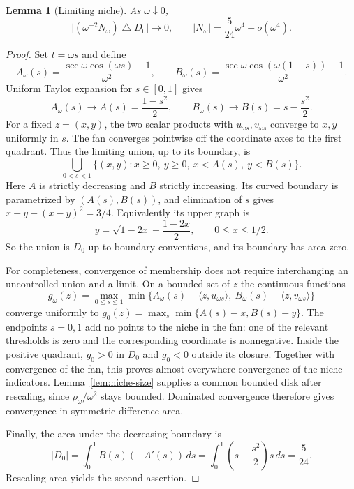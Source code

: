 \documentclass[11pt]{article}
\newtheorem{lemma}[theorem]{Lemma}
\theoremstyle{remark}\newtheorem{remark}[theorem]{Remark}
\newcommand{\area}[1]{\lvert #1\rvert}
\newcommand{\ip}[2]{\langle #1,#2\rangle}
\begin{document}
\begin{lemma}[Limiting niche]\label{lem:limit}
As $\omega\downarrow0$,
\[
 \area{(\omega^{-2}N_\omega)\mathbin\triangle D_0}\longrightarrow0,
 \qquad \area{N_\omega}=\frac5{24}\omega^4+o(\omega^4).
\]
\end{lemma}
\begin{proof}
Set $t=\omega s$ and define
\[
 A_\omega(s)=\frac{\sec\omega\cos(\omega s)-1}{\omega^2},\qquad
 B_\omega(s)=\frac{\sec\omega\cos(\omega(1-s))-1}{\omega^2}.
\]
Uniform Taylor expansion for $s\in[0,1]$ gives
\begin{equation}\label{eq:threshold-limit}
 A_\omega(s)\longrightarrow A(s)=\frac{1-s^2}{2},\qquad
 B_\omega(s)\longrightarrow B(s)=s-\frac{s^2}{2}.
\end{equation}
For a fixed $z=(x,y)$, the two scalar products with $u_{\omega s},v_{\omega s}$ converge to $x,y$ uniformly in $s$. The fan converges pointwise off the coordinate axes to the first quadrant. Thus the limiting union, up to its boundary, is
\[
 \bigcup_{0<s<1}\{(x,y):x\ge0,\ y\ge0,\ x<A(s),\ y<B(s)\}.
\]
Here $A$ is strictly decreasing and $B$ strictly increasing. Its curved boundary is parametrized by $(A(s),B(s))$, and elimination of $s$ gives $x+y+(x-y)^2=3/4$. Equivalently its upper graph is
\[
 y=\sqrt{1-2x}-\frac{1-2x}{2},\qquad0\le x\le1/2.
\]
So the union is $D_0$ up to boundary conventions, and its boundary has area zero.

For completeness, convergence of membership does not require interchanging an uncontrolled union and a limit. On a bounded set of $z$ the continuous functions
\[
 g_\omega(z)=\max_{0\le s\le1}\min\{A_\omega(s)-\ip z{u_{\omega s}},\ B_\omega(s)-\ip z{v_{\omega s}}\}
\]
converge uniformly to $g_0(z)=\max_s\min\{A(s)-x,B(s)-y\}$. The endpoints $s=0,1$ add no points to the niche in the fan: one of the relevant thresholds is zero and the corresponding coordinate is nonnegative. Inside the positive quadrant, $g_0>0$ in $D_0$ and $g_0<0$ outside its closure. Together with convergence of the fan, this proves almost-everywhere convergence of the niche indicators. Lemma~\ref{lem:niche-size} supplies a common bounded disk after rescaling, since $\rho_\omega/\omega^2$ stays bounded. Dominated convergence therefore gives convergence in symmetric-difference area.

Finally, the area under the decreasing boundary is
\[
 \area{D_0}=\int_0^1 B(s)(-A'(s))\,ds
 =\int_0^1\left(s-\frac{s^2}{2}\right)s\,ds=\frac5{24}.
\]
Rescaling area yields the second assertion.
\end{proof}
\end{document}
